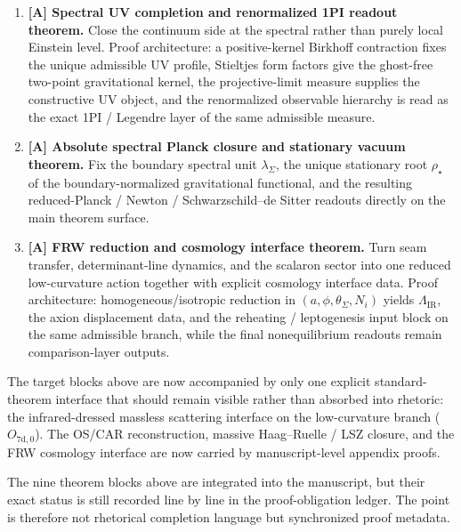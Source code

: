 \begin{tcolorbox}[colback=tfptblue!2, colframe=tfptblue!40, breakable,
    title={Version 4.5 completion surface}, colbacktitle=tfptblue!60]
\begin{enumerate}[leftmargin=1.5em, topsep=3pt, itemsep=4pt]
    \item \textbf{[A] Spectral UV completion and renormalized 1PI readout theorem.} Close the continuum side at the spectral rather than purely local Einstein level. Proof architecture: a positive-kernel Birkhoff contraction fixes the unique admissible UV profile, Stieltjes form factors give the ghost-free two-point gravitational kernel, the projective-limit measure supplies the constructive UV object, and the renormalized observable hierarchy is read as the exact 1PI / Legendre layer of the same admissible measure.
    \item \textbf{[A] Absolute spectral Planck closure and stationary vacuum theorem.} Fix the boundary spectral unit $\lambda_\Sigma$, the unique stationary root $\rho_\star$ of the boundary-normalized gravitational functional, and the resulting reduced-Planck / Newton / Schwarzschild--de Sitter readouts directly on the main theorem surface.
    \item \textbf{[A] FRW reduction and cosmology interface theorem.} Turn seam transfer, determinant-line dynamics, and the scalaron sector into one reduced low-curvature action together with explicit cosmology interface data. Proof architecture: homogeneous/isotropic reduction in $(a,\phi,\theta_\Sigma,N_i)$ yields $\Lambda_{\mathrm{IR}}$, the axion displacement data, and the reheating / leptogenesis input block on the same admissible branch, while the final nonequilibrium readouts remain comparison-layer outputs.
\end{enumerate}
\end{tcolorbox}

\begin{remark}
The target blocks above are now accompanied by only one explicit standard-theorem interface that
should remain visible rather than absorbed into rhetoric: the infrared-dressed massless scattering
interface on the low-curvature branch ($O_{7\mathrm{d,0}}$). The OS/CAR reconstruction, massive
Haag--Ruelle / LSZ closure, and the FRW cosmology interface are now carried by manuscript-level
appendix proofs.
\end{remark}

\begin{remark}
The nine theorem blocks above are integrated into the manuscript, but their exact status is still
recorded line by line in the proof-obligation ledger. The point is therefore not rhetorical
completion language but synchronized proof metadata.
\end{remark}

